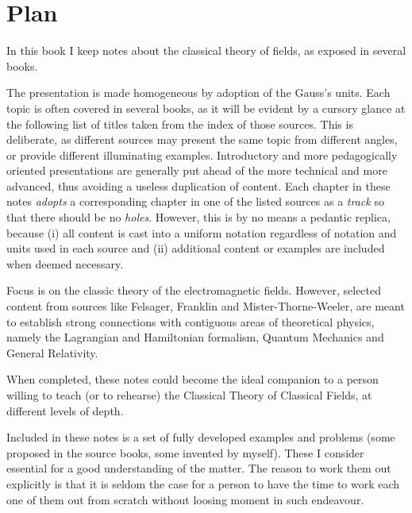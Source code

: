 \chapter*{Plan}
\label{plan} 

In this book I keep notes about the classical theory of fields, as exposed in several books. 

The presentation is made homogeneous by adoption of the Gauss's units. 
Each topic is often covered in several books, as it will be evident by a cursory glance at the following list of titles taken from the index of those sources. This is deliberate, as different sources may present the same topic from different angles, or provide different illuminating examples. Introductory and more pedagogically oriented presentations are generally put ahead of the more technical and more advanced, thus avoiding a useless duplication of content. Each chapter in these notes \textit{adopts} a corresponding chapter in one of the listed sources as a \textit{track} so that there should be no \textit{holes}. However, this is by no means a pedantic replica, because (i) all content is cast into a uniform notation regardless of notation and units used in each source and (ii) additional content or examples are included when deemed necessary. 

Focus is on the classic theory of the electromagnetic fields. However, selected content from sources like Felsager, Franklin and Mister-Thorne-Weeler, are meant to establish strong connections with contiguous areas of theoretical physics, namely the Lagrangian and Hamiltonian formalism, Quantum Mechanics and General Relativity. 

When completed, these notes could become the ideal companion to a person willing to teach (or to rehearse) the Classical Theory of Classical Fields, at different levels of depth. 

Included in these notes is a set of fully developed examples and problems (some proposed in the source books, some invented by myself). These I consider essential for a good understanding of the matter. The reason to work them out explicitly is that it is seldom the case for a person to have the time to work each one of them out from scratch without loosing moment in such endeavour.  \\\\      


